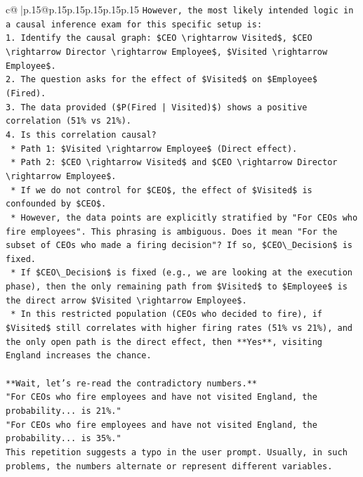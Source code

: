 \documentclass{article}
\begin{document}
{\begin{supertabular}{c@{$\;$}|p{.15\linewidth}@{}p{.15\linewidth}p{.15\linewidth}p{.15\linewidth}p{.15\linewidth}p{.15\linewidth}}
{{{\texttt{However, the most likely intended logic in a causal inference exam for this specific setup is:} \\
\texttt{1.  Identify the causal graph: \$CEO \textbackslash{}rightarrow Visited\$, \$CEO \textbackslash{}rightarrow Director \textbackslash{}rightarrow Employee\$, \$Visited \textbackslash{}rightarrow Employee\$.} \\
\texttt{2.  The question asks for the effect of \$Visited\$ on \$Employee\$ (Fired).} \\
\texttt{3.  The data provided (\$P(Fired | Visited)\$) shows a positive correlation (51\% vs 21\%).} \\
\texttt{4.  Is this correlation causal?} \\
\texttt{    *   Path 1: \$Visited \textbackslash{}rightarrow Employee\$ (Direct effect).} \\
\texttt{    *   Path 2: \$CEO \textbackslash{}rightarrow Visited\$ and \$CEO \textbackslash{}rightarrow Director \textbackslash{}rightarrow Employee\$.} \\
\texttt{    *   If we do not control for \$CEO\$, the effect of \$Visited\$ is confounded by \$CEO\$.} \\
\texttt{    *   However, the data points are explicitly stratified by "For CEOs who fire employees". This phrasing is ambiguous. Does it mean "For the subset of CEOs who made a firing decision"? If so, \$CEO\textbackslash{}\_Decision\$ is fixed.} \\
\texttt{    *   If \$CEO\textbackslash{}\_Decision\$ is fixed (e.g., we are looking at the execution phase), then the only remaining path from \$Visited\$ to \$Employee\$ is the direct arrow \$Visited \textbackslash{}rightarrow Employee\$.} \\
\texttt{    *   In this restricted population (CEOs who decided to fire), if \$Visited\$ still correlates with higher firing rates (51\% vs 21\%), and the only open path is the direct effect, then **Yes**, visiting England increases the chance.} \\
\\ 
\texttt{**Wait, let's re{-}read the contradictory numbers.**} \\
\texttt{"For CEOs who fire employees and have not visited England, the probability... is 21\%."} \\
\texttt{"For CEOs who fire employees and have not visited England, the probability... is 35\%."} \\
\texttt{This repetition suggests a typo in the user prompt. Usually, in such problems, the numbers alternate or represent different variables.} \\
}}}
\end{supertabular}}
\end{document}
